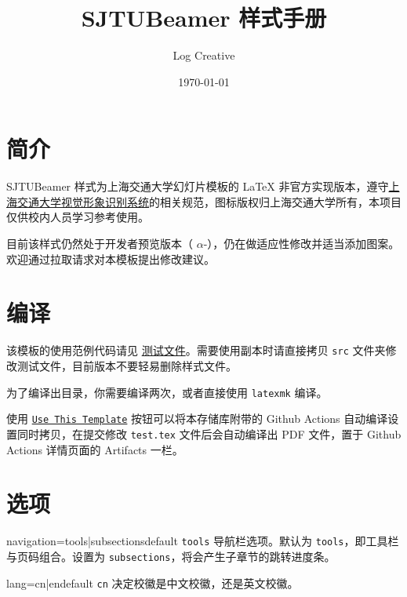 \documentclass[a4paper,12pt]{article}
\begin{document}
\begin{CJK}{UTF8}{song}
\title{\textsf{SJTUBeamer} 样式手册}
\author{Log Creative}
\date{\today}
\maketitle

\tableofcontents    %

\section{简介}

\textsf{SJTUBeamer} 样式为上海交通大学幻灯片模板的 \LaTeX{} 非官方实现版本，遵守\href{http://vi.sjtu.edu.cn/}{上海交通大学视觉形象识别系统}的相关规范，图标版权归上海交通大学所有，本项目仅供校内人员学习参考使用。

目前该样式仍然处于开发者预览版本（ $\alpha$-），仍在做适应性修改并适当添加图案。欢迎通过拉取请求对本模板提出修改建议。

\section{编译}

该模板的使用范例代码请见 \href{https://github.com/LogCreative/SJTUBeamer/blob/main/src/test.tex}{测试文件}。需要使用副本时请直接拷贝 \verb"src" 文件夹修改测试文件，目前版本不要轻易删除样式文件。

为了编译出目录，你需要编译两次，或者直接使用 \verb"latexmk" 编译。

使用 \href{https://github.com/LogCreative/SJTUBeamer/generate}{\texttt{Use This Template}} 按钮可以将本存储库附带的 Github Actions 自动编译设置同时拷贝，在提交修改 \verb"test.tex" 文件后会自动编译出 PDF 文件，置于 Github Actions 详情页面的 Artifacts 一栏。

\section{选项}

\begin{docKey*}[SJTUBeamer]{navigation}{=tools|subsections}{default \texttt{tools}}
    导航栏选项。默认为 \verb"tools"，即工具栏与页码组合。设置为 \verb"subsections"，将会产生子章节的跳转进度条。
\end{docKey*}

\begin{docKey*}[SJTUBeamer]{lang}{=cn|en}{default \texttt{cn}}
    决定校徽是中文校徽，还是英文校徽。
\end{docKey*}


\end{CJK}
\end{document}
